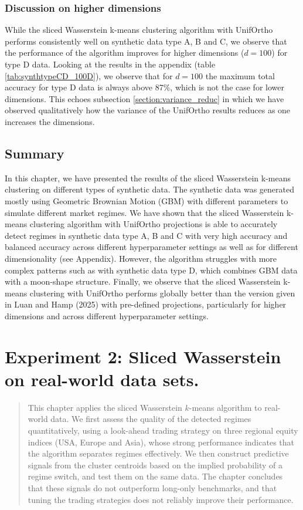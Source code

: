 \documentclass[12pt,a4paper]{report}
\begin{document}
\subsection{Discussion on higher dimensions}
While the sliced Wasserstein k-means clustering algorithm with UnifOrtho performs consistently well on synthetic data type A, B and C, we observe that the performance of the algorithm improves for higher dimensions ($d=100$) for type D data.
Looking at the results in the appendix (table \ref{tab:synthtypeCD_100D}), we observe that for $d=100$ the maximum total accuracy for type D data is always above 87\%, which is not the case for lower dimensions. This echoes subsection \ref{section:variance_reduc}
in which we have observed qualitatively how the variance of the UnifOrtho results reduces as one increases the dimensions.  


\section{Summary}
In this chapter, we have presented the results of the sliced Wasserstein k-means clustering on different 
types of synthetic data. The synthetic data was generated mostly using Geometric Brownian Motion (GBM) with different parameters to simulate different market regimes.
We have shown that the sliced Wasserstein k-means clustering algorithm with UnifOrtho projections is able to accurately detect regimes in synthetic data type A, B and C with very high accuracy and balanced accuracy across different hyperparameter settings as well as for different dimensionality (see Appendix). 
However, the algorithm struggles with more complex patterns such as with synthetic data type D, which combines GBM data with a moon-shape structure.
Finally, we observe that the sliced Wasserstein k-means clustering with UnifOrtho performs globally better than the version given in Luan and Hamp (2025) \cite{LuanHamp2025} with pre-defined projections, particularly for higher dimensions and across different hyperparameter settings.


\chapter{Experiment 2: Sliced Wasserstein on real-world data sets.}

\begin{quote}
This chapter applies the sliced Wasserstein $k$-means algorithm to real-world data.
We first assess the quality of the detected regimes quantitatively, using a
look-ahead trading strategy on three regional equity indices (USA, Europe and Asia),
whose strong performance indicates that the algorithm separates regimes effectively.
We then construct predictive signals from the cluster centroids based on the implied
probability of a regime switch, and test them on the same data. The chapter concludes
that these signals do not outperform long-only benchmarks, and that tuning the trading
strategies does not reliably improve their performance.
\end{quote}
\end{document}
